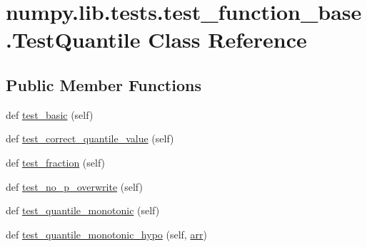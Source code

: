 \hypertarget{classnumpy_1_1lib_1_1tests_1_1test__function__base_1_1TestQuantile}{}\section{numpy.\+lib.\+tests.\+test\+\_\+function\+\_\+base.\+Test\+Quantile Class Reference}
\label{classnumpy_1_1lib_1_1tests_1_1test__function__base_1_1TestQuantile}
\subsection*{Public Member Functions}
\begin{DoxyCompactItemize}
\item 
def \hyperlink{classnumpy_1_1lib_1_1tests_1_1test__function__base_1_1TestQuantile_ad60adf57994448247052e48abcdd83a8}{test\+\_\+basic} (self)
\item 
def \hyperlink{classnumpy_1_1lib_1_1tests_1_1test__function__base_1_1TestQuantile_a7ea3dc7d8301a9c76a3831958b663606}{test\+\_\+correct\+\_\+quantile\+\_\+value} (self)
\item 
def \hyperlink{classnumpy_1_1lib_1_1tests_1_1test__function__base_1_1TestQuantile_aad0c0b5801f30e44ccca55113c4d8de3}{test\+\_\+fraction} (self)
\item 
def \hyperlink{classnumpy_1_1lib_1_1tests_1_1test__function__base_1_1TestQuantile_a4537e3a0d36002d0b47abffbb3c21155}{test\+\_\+no\+\_\+p\+\_\+overwrite} (self)
\item 
def \hyperlink{classnumpy_1_1lib_1_1tests_1_1test__function__base_1_1TestQuantile_adf66daeeeb969aff4cfbbc6c273e6fde}{test\+\_\+quantile\+\_\+monotonic} (self)
\item 
def \hyperlink{classnumpy_1_1lib_1_1tests_1_1test__function__base_1_1TestQuantile_a97fb42c78d9dcdca909bb10181c23975}{test\+\_\+quantile\+\_\+monotonic\+\_\+hypo} (self, \hyperlink{classnumpy_1_1lib_1_1tests_1_1test__function__base_1_1TestQuantile_a5a1c9aa6d7af7cdee5f3c7226bc15b9a}{arr})
\end{DoxyCompactItemize}

